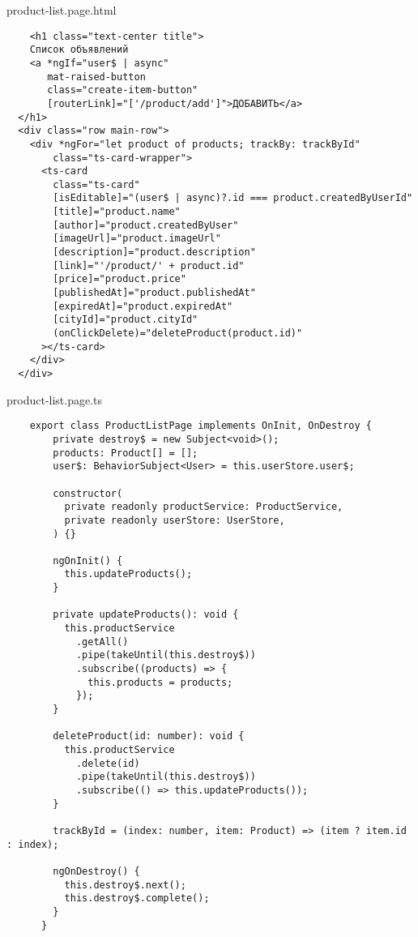 product-list.page.html
\begin{lstlisting}
    <h1 class="text-center title">
    Список объявлений
    <a *ngIf="user$ | async"
       mat-raised-button
       class="create-item-button"
       [routerLink]="['/product/add']">ДОБАВИТЬ</a>
  </h1>
  <div class="row main-row">
    <div *ngFor="let product of products; trackBy: trackById"
        class="ts-card-wrapper">
      <ts-card
        class="ts-card"
        [isEditable]="(user$ | async)?.id === product.createdByUserId"
        [title]="product.name"
        [author]="product.createdByUser"
        [imageUrl]="product.imageUrl"
        [description]="product.description"
        [link]="'/product/' + product.id"
        [price]="product.price"
        [publishedAt]="product.publishedAt"
        [expiredAt]="product.expiredAt"
        [cityId]="product.cityId"
        (onClickDelete)="deleteProduct(product.id)"
      ></ts-card>
    </div>
  </div>
\end{lstlisting}


product-list.page.ts
\begin{lstlisting}
    export class ProductListPage implements OnInit, OnDestroy {
        private destroy$ = new Subject<void>();
        products: Product[] = [];
        user$: BehaviorSubject<User> = this.userStore.user$;
      
        constructor(
          private readonly productService: ProductService,
          private readonly userStore: UserStore,
        ) {}
      
        ngOnInit() {
          this.updateProducts();
        }
      
        private updateProducts(): void {
          this.productService
            .getAll()
            .pipe(takeUntil(this.destroy$))
            .subscribe((products) => {
              this.products = products;
            });
        }
      
        deleteProduct(id: number): void {
          this.productService
            .delete(id)
            .pipe(takeUntil(this.destroy$))
            .subscribe(() => this.updateProducts());
        }
      
        trackById = (index: number, item: Product) => (item ? item.id : index);
      
        ngOnDestroy() {
          this.destroy$.next();
          this.destroy$.complete();
        }
      }      
\end{lstlisting}

